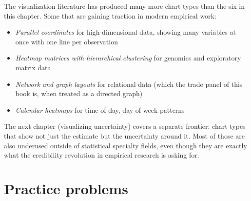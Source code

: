 \documentclass[
  letterpaper,
  11pt,
  twoside,
  openany]{scrbook}
\providecommand{\tightlist}{%
  \setlength{\itemsep}{0pt}\setlength{\parskip}{0pt}}
\begin{document}
\begin{tcolorbox}[enhanced jigsaw, arc=.35mm, bottomrule=.15mm, bottomtitle=1mm, breakable, colback=white, colbacktitle=quarto-callout-important-color!10!white, colframe=quarto-callout-important-color-frame, coltitle=black, left=2mm, leftrule=.75mm, opacityback=0, opacitybacktitle=0.6, rightrule=.15mm, title=\textcolor{quarto-callout-important-color}{\faExclamation}\hspace{0.5em}{Frontier note}, titlerule=0mm, toprule=.15mm, toptitle=1mm]

The visualization literature has produced many more chart types than the
six in this chapter. Some that are gaining traction in modern empirical
work:

\begin{itemize}
\tightlist
\item
  \emph{Parallel coordinates} for high-dimensional data, showing many
  variables at once with one line per observation
\item
  \emph{Heatmap matrices with hierarchical clustering} for genomics and
  exploratory matrix data
\item
  \emph{Network and graph layouts} for relational data (which the trade
  panel of this book is, when treated as a directed graph)
\item
  \emph{Calendar heatmaps} for time-of-day, day-of-week patterns
\end{itemize}

The next chapter (visualizing uncertainty) covers a separate frontier:
chart types that show not just the estimate but the uncertainty around
it. Most of those are also underused outside of statistical specialty
fields, even though they are exactly what the credibility revolution in
empirical research is asking for.

\end{tcolorbox}

\section{Practice problems}\label{practice-problems-6}
\end{document}
